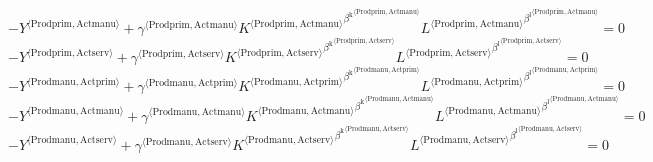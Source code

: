 \begin{equation}
-{Y}^{\langle \mathrm{Prodprim},\mathrm{Actmanu}\rangle} + {{\gamma}^{\langle \mathrm{\mathrm{Prodprim}},\mathrm{\mathrm{Actmanu}}\rangle}} {{{K}^{\langle \mathrm{Prodprim},\mathrm{Actmanu}\rangle}}^{{\beta^{\mathrm{k}}}^{\langle \mathrm{\mathrm{Prodprim}},\mathrm{\mathrm{Actmanu}}\rangle}}} {{{L}^{\langle \mathrm{Prodprim},\mathrm{Actmanu}\rangle}}^{{\beta^{\mathrm{l}}}^{\langle \mathrm{\mathrm{Prodprim}},\mathrm{\mathrm{Actmanu}}\rangle}}} = 0
\end{equation}
\begin{equation}
-{Y}^{\langle \mathrm{Prodprim},\mathrm{Actserv}\rangle} + {{\gamma}^{\langle \mathrm{\mathrm{Prodprim}},\mathrm{\mathrm{Actserv}}\rangle}} {{{K}^{\langle \mathrm{Prodprim},\mathrm{Actserv}\rangle}}^{{\beta^{\mathrm{k}}}^{\langle \mathrm{\mathrm{Prodprim}},\mathrm{\mathrm{Actserv}}\rangle}}} {{{L}^{\langle \mathrm{Prodprim},\mathrm{Actserv}\rangle}}^{{\beta^{\mathrm{l}}}^{\langle \mathrm{\mathrm{Prodprim}},\mathrm{\mathrm{Actserv}}\rangle}}} = 0
\end{equation}
\begin{equation}
-{Y}^{\langle \mathrm{Prodmanu},\mathrm{Actprim}\rangle} + {{\gamma}^{\langle \mathrm{\mathrm{Prodmanu}},\mathrm{\mathrm{Actprim}}\rangle}} {{{K}^{\langle \mathrm{Prodmanu},\mathrm{Actprim}\rangle}}^{{\beta^{\mathrm{k}}}^{\langle \mathrm{\mathrm{Prodmanu}},\mathrm{\mathrm{Actprim}}\rangle}}} {{{L}^{\langle \mathrm{Prodmanu},\mathrm{Actprim}\rangle}}^{{\beta^{\mathrm{l}}}^{\langle \mathrm{\mathrm{Prodmanu}},\mathrm{\mathrm{Actprim}}\rangle}}} = 0
\end{equation}
\begin{equation}
-{Y}^{\langle \mathrm{Prodmanu},\mathrm{Actmanu}\rangle} + {{\gamma}^{\langle \mathrm{\mathrm{Prodmanu}},\mathrm{\mathrm{Actmanu}}\rangle}} {{{K}^{\langle \mathrm{Prodmanu},\mathrm{Actmanu}\rangle}}^{{\beta^{\mathrm{k}}}^{\langle \mathrm{\mathrm{Prodmanu}},\mathrm{\mathrm{Actmanu}}\rangle}}} {{{L}^{\langle \mathrm{Prodmanu},\mathrm{Actmanu}\rangle}}^{{\beta^{\mathrm{l}}}^{\langle \mathrm{\mathrm{Prodmanu}},\mathrm{\mathrm{Actmanu}}\rangle}}} = 0
\end{equation}
\begin{equation}
-{Y}^{\langle \mathrm{Prodmanu},\mathrm{Actserv}\rangle} + {{\gamma}^{\langle \mathrm{\mathrm{Prodmanu}},\mathrm{\mathrm{Actserv}}\rangle}} {{{K}^{\langle \mathrm{Prodmanu},\mathrm{Actserv}\rangle}}^{{\beta^{\mathrm{k}}}^{\langle \mathrm{\mathrm{Prodmanu}},\mathrm{\mathrm{Actserv}}\rangle}}} {{{L}^{\langle \mathrm{Prodmanu},\mathrm{Actserv}\rangle}}^{{\beta^{\mathrm{l}}}^{\langle \mathrm{\mathrm{Prodmanu}},\mathrm{\mathrm{Actserv}}\rangle}}} = 0
\end{equation}
